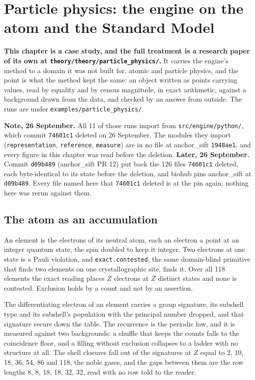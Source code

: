 \chapter{Particle physics: the engine on the atom and the Standard Model}

\textbf{This chapter is a case study, and the full treatment is a research paper of its own at
\texttt{theory/\allowbreak{}theory/\allowbreak{}particle\_physics/}.} It carries the engine's method to a domain it was not
built for, atomic and particle physics, and the point is what the method kept the same: an object
written as points carrying values, read by equality and by census magnitude, in exact arithmetic,
against a background drawn from the data, and checked by an answer from outside. The runs are under
\texttt{examples/\allowbreak{}particle\_physics/}.

\textbf{Note, 26 September.} All 11 of those runs import from \texttt{src/\allowbreak{}engine/\allowbreak{}python/},
which commit \texttt{74601c1} deleted on 26 September. The modules they import
(\texttt{representation}, \texttt{reference}, \texttt{measure}) are in no file at anchor\_sift
\texttt{1948ae1}, and every figure in this chapter was read before the deletion.
\textbf{Later, 26 September.} Commit \texttt{d09b489} (anchor\_sift PR 12) put back the 126 files
\texttt{74601c1} deleted, each byte-identical to its state before the deletion, and biohub pins
anchor\_sift at \texttt{d09b489}. Every file named here that \texttt{74601c1} deleted is at the pin
again; nothing here was rerun against them.

\section{The atom as an accumulation}

An element is the electrons of its neutral atom, each an electron a point at an integer quantum state,
the spin doubled to keep it integer. Two electrons at one state is a Pauli violation, and
\texttt{exact.contested}, the same domain-blind primitive that finds two elements on one
crystallographic site, finds it. Over all 118 elements the exact reading places $Z$ electrons at $Z$
distinct states and none is contested. Exclusion holds by a count and not by an assertion.

The differentiating electron of an element carries a group signature, its subshell type and its
subshell's population with the principal number dropped, and that signature recurs down the table. The
recurrence is the periodic law, and it is measured against two backgrounds: a shuffle that keeps the
counts falls to the coincidence floor, and a filling without exclusion collapses to a ladder with no
structure at all. The shell closures fall out of the signatures at $Z$ equal to 2, 10, 18, 36, 54, 86
and 118, the noble gases, and the gaps between them are the row lengths 8, 8, 18, 18, 32, 32, read with
no row told to the reader.

